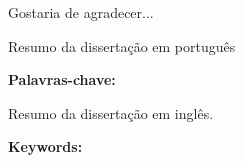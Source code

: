 \begin{agradecimentos}
\vspace*{\fill}
\OnehalfSpacing
Gostaria de agradecer...

\lipsum[2]

\vspace*{\fill}
\end{agradecimentos}



\begin{resumo}
\normalsize

Resumo da dissertação em português

\lipsum[3]

\vspace{\onelineskip}

\noindent
\textbf{Palavras-chave:} \imprimirpalavraschave
\end{resumo}

\begin{resumo}[Abstract]
Resumo da dissertação em inglês.

\lipsum[4]

\vspace{\onelineskip}

\noindent
\textbf{Keywords:} \imprimirkeyword   
\end{resumo}

{\SingleSpacing
{}
\listoffigures*
\cleardoublepage
}


